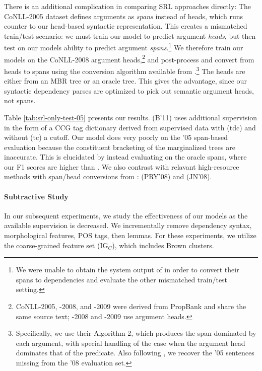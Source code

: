 \documentclass[11pt]{article}
\newcommand{\coarseIgFeats}{\textrm{IG$_{C}$}}
\begin{document}
There is an additional complication in comparing SRL approaches directly:  
The CoNLL-2005 dataset defines arguments as \emph{spans} instead of
heads,
which runs counter to our head-based syntactic
representation. This creates a mismatched train/test scenario: we must
train our model to predict argument \emph{heads}, but then test on our models
ability to predict argument \emph{spans}.\footnote{
We were unable to obtain the
  system output of  in order to convert
  their spans to dependencies and evaluate the other mismatched train/test
  setting.}  We therefore train our models on the CoNLL-2008 argument 
  heads,\footnote{CoNLL-2005, -2008, and -2009  were derived from PropBank 
and share the same source text; -2008 and -2009 use argument heads.}
  and post-process and convert from heads to spans using the conversion algorithm available
  from .\footnote{
  Specifically, we use their Algorithm 2, which produces the span dominated by each
argument, with special handling of the case when the argument head
dominates that of the predicate.  Also following
  , we recover the '05
  sentences missing from the '08 evaluation set.} The heads are either from an
MBR tree or an oracle tree. This gives  the advantage, since our
syntactic dependency parses are optimized to pick out semantic argument
heads, not spans.

Table \ref{tab:srl-only-test-05} presents our results.
 (B'11) uses additional supervision in
the form of a CCG tag dictionary derived from supervised data with
(tdc) and without (tc) a cutoff. 
Our model does very poorly on the '05 span-based evaluation because
the constituent bracketing of the marginalized trees are
inaccurate. This is elucidated by instead evaluating on the oracle
spans, where our F1 scores are higher than
. We also contrast with relavant
high-resource methods with span/head conversions from
:
 (PRY'08) and
 (JN'08).

\paragraph{Subtractive Study}

In our subsequent experiments, we study the effectiveness of our
models as the available supervision is decreased. We
incrementally remove dependency syntax, morphological features, POS tags,
then lemmas. For these experiments, we utilize the coarse-grained 
feature set (\coarseIgFeats{}), which includes Brown clusters.
\end{document}
